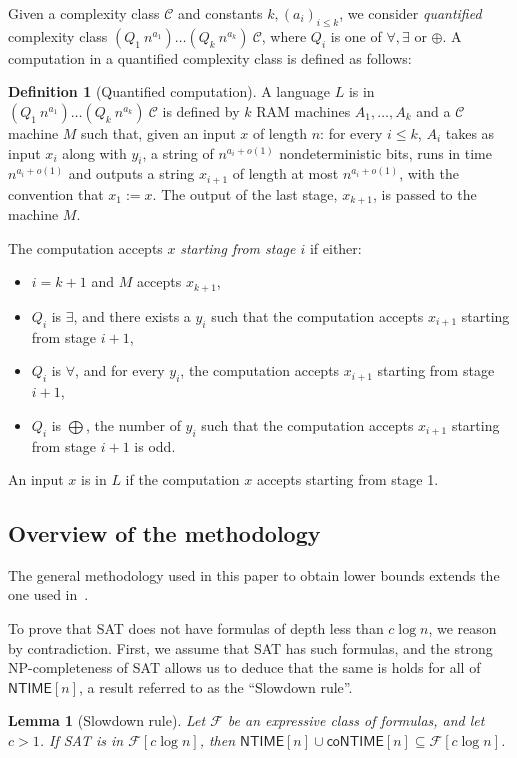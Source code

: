 \documentclass[a4paper, 11pt]{article}
\theoremstyle{plain}
\newtheorem{lemma}[theorem]{Lemma}
\theoremstyle{definition}
\newtheorem{definition}[theorem]{Definition}
\theoremstyle{remark}
\newcommand{\Cc}{\mathcal{C}}%
\newcommand{\Ff}{\mathcal{F}}%
\newcommand{\NP}{\textsf{NP}}%
\newcommand{\NTIME}{\textsf{NTIME}}%
\newcommand{\coNTIME}{\textsf{coNTIME}}%
\newcommand{\SAT}{\textsf{SAT}}%
\begin{document}
Given a complexity class $\Cc$ and constants $k, (a_i)_{i\leq k}$, 
we consider \textit{quantified} complexity
class $(Q_1~n^{a_1})\ldots(Q_k~n^{a_k})~\Cc$, 
where $Q_i$ is one of $\forall, \exists$ or $\oplus$.
A computation in a quantified complexity class is defined as follows:
\begin{definition}[Quantified computation]
	A language $L$ is in $(Q_1~n^{a_1})\ldots(Q_k~n^{a_k})~\Cc$ 
	is defined by $k$ RAM machines $A_1, \ldots, A_k$ and a $\Cc$ machine $M$
	such that, given an input $x$ of length $n$:
	for every $i \le k$, $A_{i}$ takes as input $x_i$ along with $y_i$, 
	a string of $n^{a_{i} + o(1)}$ nondeterministic bits,
	runs in time $n^{a_{i} + o(1)}$ and outputs a string $x_{i+1}$ of length at most $n^{a_{i} + o(1)}$, 
	with the convention that $x_1 := x$.
	The output of the last stage, $x_{k+1}$, is passed to the machine $M$. 

	The computation accepts $x$ \textit{starting from stage $i$} if either:
	\begin{itemize}
		\item $i = k+1$ and $M$ accepts $x_{k+1}$, 
		\item $Q_i$ is $\exists$, and there exists a $y_i$ such that the computation
		accepts $x_{i+1}$ starting from stage $i+1$, 
		\item $Q_i$ is $\forall$, and for every $y_i$, the computation
		accepts $x_{i+1}$ starting from stage $i+1$, 
		\item $Q_i$ is $\bigoplus$, the number of $y_i$ such that the computation
		accepts $x_{i+1}$ starting from stage $i+1$ is odd. 
	\end{itemize}

	An input $x$ is in $L$ if the computation $x$ accepts starting from stage 1.
\end{definition}

\subsection{Overview of the methodology}

The general methodology used in this paper to obtain lower bounds
extends the one used in~\cite{mudigonda2020time}.

To prove that \SAT{} does not have formulas of depth less than $c\log n$, 
we reason by contradiction.
First, we assume that \SAT{} has such formulas, and the strong \NP-completeness of \SAT{}
allows us to deduce that the same is holds for all of $\NTIME[n]$, 
a result referred to as the ``Slowdown rule''.
\begin{lemma}[Slowdown rule]
	Let $\Ff$ be an expressive class of formulas, and let $c > 1$.
	If \SAT{} is in $\Ff[c \log n]$,
	then $\NTIME[n] \cup \coNTIME[n] \subseteq \Ff[c \log n]$.
\end{lemma}
\end{document}

